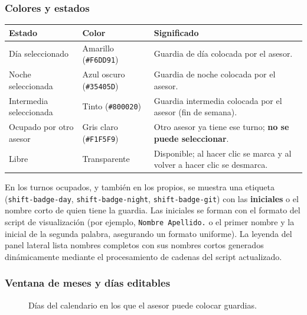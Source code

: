 \documentclass[11pt,a4paper]{article}
\newcommand{\code}[1]{\texttt{#1}}
\begin{document}
\subsubsection{Colores y estados}
\begin{longtable}{@{}p{4.6cm}p{3.8cm}p{6.4cm}@{}}
\toprule
\textbf{Estado} & \textbf{Color} & \textbf{Significado} \\
\midrule
\endhead
Día seleccionado & Amarillo (\code{\#F6DD91}) & Guardia de día colocada por el asesor. \\
Noche seleccionada & Azul oscuro (\code{\#35405D}) & Guardia de noche colocada por el asesor. \\
Intermedia seleccionada & Tinto (\code{\#800020}) & Guardia intermedia colocada por el asesor (fin de semana). \\
Ocupado por otro asesor & Gris claro (\code{\#F1F5F9}) & Otro asesor ya tiene ese turno; \textbf{no se puede seleccionar}. \\
Libre & Transparente & Disponible; al hacer clic se marca y al volver a hacer clic se desmarca. \\
\bottomrule
\end{longtable}

En los turnos ocupados, y también en los propios, se muestra una etiqueta (\code{shift-badge-day}, \code{shift-badge-night}, \code{shift-badge-git}) con las \textbf{iniciales} o el nombre corto de quien tiene la guardia. Las iniciales se forman con el formato del script de visualización (por ejemplo, \code{Nombre Apellido.} o el primer nombre y la inicial de la segunda palabra, asegurando un formato uniforme). La leyenda del panel lateral lista nombres completos con sus nombres cortos generados dinámicamente mediante el procesamiento de cadenas del script actualizado.

\subsubsection{Ventana de meses y días editables}
\begin{figure}[h!]
\centering
{}
\caption{Días del calendario en los que el asesor puede colocar guardias.}
\end{figure}
\end{document}
